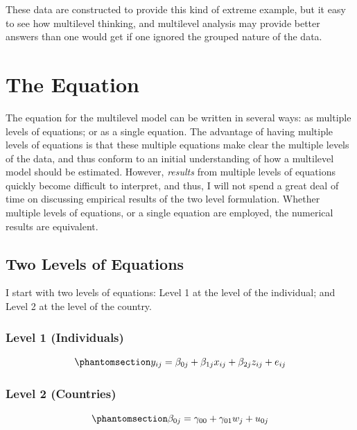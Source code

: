 \documentclass[
  letterpaper,
  DIV=11,
  numbers=noendperiod]{scrreprt}
\begin{document}
These data are constructed to provide this kind of extreme example, but
it easy to see how multilevel thinking, and multilevel analysis may
provide better answers than one would get if one ignored the grouped
nature of the data.

\section{The Equation}\label{the-equation}

The equation for the multilevel model can be written in several ways: as
multiple levels of equations; or as a single equation. The advantage of
having multiple levels of equations is that these multiple equations
make clear the multiple levels of the data, and thus conform to an
initial understanding of how a multilevel model should be estimated.
However, \emph{results} from multiple levels of equations quickly become
difficult to interpret, and thus, I will not spend a great deal of time
on discussing empirical results of the two level formulation. Whether
multiple levels of equations, or a single equation are employed, the
numerical results are equivalent.

\subsection{Two Levels of Equations}\label{two-levels-of-equations}

I start with two levels of equations: Level 1 at the level of the
individual; and Level 2 at the level of the country.

\subsubsection{Level 1 (Individuals)}\label{level-1-individuals}

\begin{equation}\phantomsection\label{eq-MLM1}{y_{ij} = \beta_{0j} + \beta_{1j} x_{ij} + \beta_{2j} z_{ij} + e_{ij}}\end{equation}

\subsubsection{Level 2 (Countries)}\label{level-2-countries}

\begin{equation}\phantomsection\label{eq-MLM2}{\beta_{0j} = \gamma_{00} +\gamma_{01} w_j + u_{0j}}\end{equation}
\end{document}
